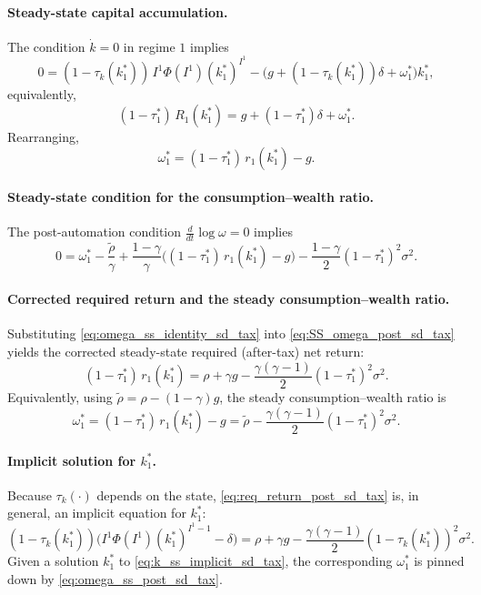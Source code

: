 \documentclass{article}
\begin{document}
\paragraph{Steady-state capital accumulation.}
The condition $\dot k=0$ in regime $1$ implies
$$
0=(1-\tau_k(k_1^\ast))\,I^1\Phi(I^1)(k_1^\ast)^{I^1}
-\Big(g+(1-\tau_k(k_1^\ast))\delta+\omega_1^\ast\Big)k_1^\ast,
$$
equivalently,
$$
(1-\tau_1^\ast)\,R_1(k_1^\ast)=g+(1-\tau_1^\ast)\delta+\omega_1^\ast.
\tag{SS-k}
\label{eq:SS_k_post_sd_tax}
$$
Rearranging,
$$
\omega_1^\ast=(1-\tau_1^\ast)\,r_1(k_1^\ast)-g.
\tag{A}
\label{eq:omega_ss_identity_sd_tax}
$$

\paragraph{Steady-state condition for the consumption--wealth ratio.}
The post-automation condition $\tfrac{d}{dt}\log\omega=0$ implies
$$
0=\omega_1^\ast
-\frac{\tilde\rho}{\gamma}
+\frac{1-\gamma}{\gamma}\Big((1-\tau_1^\ast)\,r_1(k_1^\ast)-g\Big)
-\frac{1-\gamma}{2}(1-\tau_1^\ast)^2\sigma^2.
\tag{SS-$\omega$}
\label{eq:SS_omega_post_sd_tax}
$$

\paragraph{Corrected required return and the steady consumption--wealth ratio.}
Substituting \eqref{eq:omega_ss_identity_sd_tax} into \eqref{eq:SS_omega_post_sd_tax} yields the corrected steady-state required (after-tax) net return:
$$
(1-\tau_1^\ast)\,r_1(k_1^\ast)
=\rho+\gamma g-\frac{\gamma(\gamma-1)}{2}(1-\tau_1^\ast)^2\sigma^2.
\tag{B}
\label{eq:req_return_post_sd_tax}
$$
Equivalently, using $\tilde\rho=\rho-(1-\gamma)g$, the steady consumption--wealth ratio is
$$
\omega_1^\ast
=(1-\tau_1^\ast)\,r_1(k_1^\ast)-g
=\tilde\rho-\frac{\gamma(\gamma-1)}{2}(1-\tau_1^\ast)^2\sigma^2.
\tag{C}
\label{eq:omega_ss_post_sd_tax}
$$

\paragraph{Implicit solution for $k_1^\ast$.}
Because $\tau_k(\cdot)$ depends on the state, \eqref{eq:req_return_post_sd_tax} is, in general, an implicit equation for $k_1^\ast$:
$$
(1-\tau_k(k_1^\ast))\Big(I^1\Phi(I^1)(k_1^\ast)^{I^1-1}-\delta\Big)
=\rho+\gamma g-\frac{\gamma(\gamma-1)}{2}(1-\tau_k(k_1^\ast))^2\sigma^2.
\tag{D}
\label{eq:k_ss_implicit_sd_tax}
$$
Given a solution $k_1^\ast$ to \eqref{eq:k_ss_implicit_sd_tax}, the corresponding $\omega_1^\ast$ is pinned down by \eqref{eq:omega_ss_post_sd_tax}.
\end{document}
